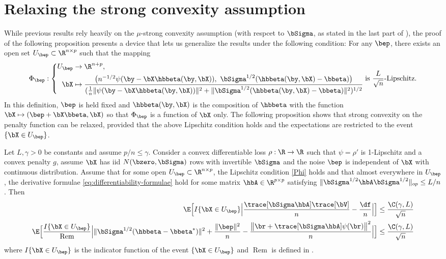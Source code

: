 \documentclass{colt2022} %
\DeclareMathOperator{\Rem}{Rem}
\numberwithin{equation}{section}
\begin{document}
\section{Relaxing the strong convexity assumption}

While previous results rely heavily on the $\mu$-strong convexity assumption
(with respcet to $\bSigma$, as stated in the last part of ),
the proof of the following proposition presents a device that lets us generalize the results
under the following condition: For any $\bep$, there exists an open set
$U_{\bep}\subset\R^{n\times p}$ such that the mapping
\begin{equation}
    \label{Phi}
    \Phi_{\bep}:
    \left\{
\begin{aligned}
        U_{\bep} &\to \R^{n+p}, \qquad
        \\ \bX &\mapsto 
        \frac{
            \bigl(
                n^{-1/2}\psi(\by-\bX\hbbeta(\by,\bX)), ~
            \bSigma^{1/2}(\hbbeta(\by,\bX) -\bbeta )
            \bigr)
        }{
            (\frac1n \|\psi(\by-\bX\hbbeta(\by,\bX))\|^2
            + \|\bSigma^{1/2}(\hbbeta(\by,\bX) -\bbeta )\|^2
            )^{1/2}
        }
\end{aligned}
\right.
\text{is $\frac{L}{\sqrt n}$-Lipschitz.}
\end{equation}
In this definition, $\bep$ is held fixed
and $\hbbeta(\by,\bX)$ is the composition of $\hbbeta$
with the function $\bX\mapsto (\bep+\bX\bbeta, \bX)$
so that $\Phi_{\bep}$ is a function of $\bX$ only.
The following proposition shows that strong convexity on the penalty
function can be relaxed, provided that the above Lipschitz condition
holds and the expectations are restricted to the event $\{\bX \in U_{\bep}\}$.
\begin{proposition}
    \label{prop12}
    Let $L,\gamma>0$ be constants and assume $p/n\le\gamma$.
    Consider a convex differentiable loss $\rho:\R\to\R$
    such that $\psi=\rho'$ is 1-Lipschitz and a convex penalty $g$,
    assume $\bX$ has iid $N(\bzero,\bSigma)$ rows with 
    invertible $\bSigma$ and the noise $\bep$ is independent
    of $\bX$ with continuous distribution.
    Assume that for some open $U_{\bep}\subset\R^{n\times p}$,
    the Lipschitz condition \eqref{Phi} holds and that
    almost everywhere in $U_{\bep}$, the derivative formulae \eqref{eq:differentiability-formulae} hold for some matrix $\hbA\in\R^{p\times p}$
    satisfying $\|\bSigma^{1/2}\hbA\bSigma^{1/2}\|_{op}\le L/n$. Then
    \begin{align}
        \E\Bigl[I\{\bX\in U_\bep\}\Big|\frac{\trace[\bSigma \hbA]\trace[\bV]}{n}
        -\frac{\df}{n}\Big|\Bigr] &\le \frac{\C(\gamma,L) }{\sqrt n} \\
        \E\Bigl[\frac{I\{\bX\in U_\bep\}}{\Rem}
        \Big|
        \|\bSigma^{1/2}(\hbbeta-\bbeta^*)\|^2 + \frac{\|\bep\|^2}{n}
        - \frac{\big\| \br + \trace[\bSigma\hbA]\psi(\br)\big\|^2}{n}
        \Big|
        \Bigr]
                              &\le \frac{\C(\gamma, L)}{\sqrt n}
    \end{align}
    where $I\{\bX\in U_\bep\}$ is the indicator function of the event
    $\{\bX\in U_\bep\}$ and $\Rem$ is defined in
    .

\end{proposition}
\end{document}
